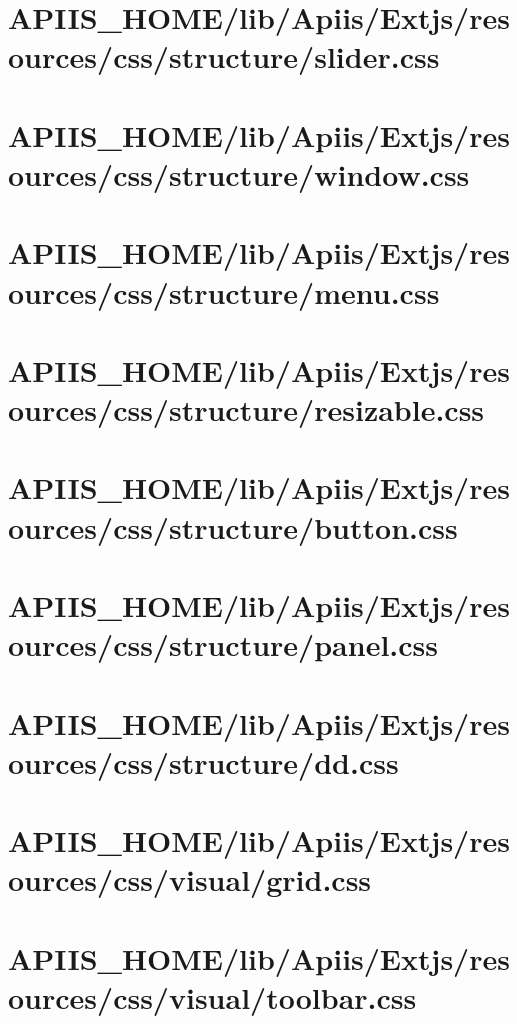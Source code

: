\section{APIIS\_HOME/lib/Apiis/Extjs/resources/css/structure/slider.css} 
\section{APIIS\_HOME/lib/Apiis/Extjs/resources/css/structure/window.css} 
\section{APIIS\_HOME/lib/Apiis/Extjs/resources/css/structure/menu.css} 
\section{APIIS\_HOME/lib/Apiis/Extjs/resources/css/structure/resizable.css} 
\section{APIIS\_HOME/lib/Apiis/Extjs/resources/css/structure/button.css} 
\section{APIIS\_HOME/lib/Apiis/Extjs/resources/css/structure/panel.css} 
\section{APIIS\_HOME/lib/Apiis/Extjs/resources/css/structure/dd.css} 
\section{APIIS\_HOME/lib/Apiis/Extjs/resources/css/visual/grid.css} 
\section{APIIS\_HOME/lib/Apiis/Extjs/resources/css/visual/toolbar.css} 
